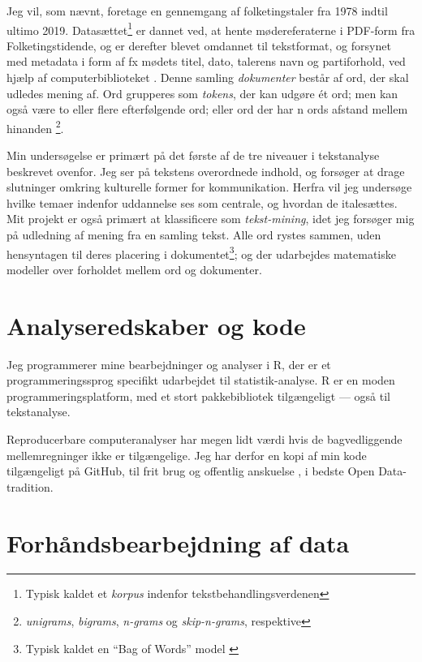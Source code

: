 Jeg vil, som nævnt, foretage en gennemgang af folketingstaler fra 1978 indtil ultimo 2019.
Datasættet\footnote{Typisk kaldet et \textit{korpus} indenfor tekstbehandlingsverdenen} er dannet ved, at hente mødereferaterne i PDF-form fra Folketingstidende, og er derefter blevet omdannet til tekstformat, og forsynet med metadata i form af fx mødets titel, dato, talerens navn og partiforhold, ved hjælp af computerbiblioteket  \autocite{pedersenFolketinget2019}.
Denne samling \textit{dokumenter} består af ord, der skal udledes mening af.
Ord grupperes som \textit{tokens}, der kan udgøre ét ord; men kan også være to eller flere efterfølgende ord; eller ord der har n ords afstand mellem hinanden \footnote{\textit{unigrams}, \textit{bigrams}, \textit{n-grams} og \textit{skip-n-grams}, respektive}.

Min undersøgelse er primært på det første af de tre niveauer i tekstanalyse beskrevet ovenfor.
Jeg ser på tekstens overordnede indhold, og forsøger at drage slutninger omkring kulturelle former for kommunikation.
Herfra vil jeg undersøge hvilke temaer indenfor uddannelse ses som centrale, og hvordan de italesættes.
Mit projekt er også primært at klassificere som \textit{tekst-mining}, idet jeg forsøger mig på udledning af mening fra en samling tekst.
Alle ord rystes sammen, uden hensyntagen til deres placering i dokumentet\footnote{Typisk kaldet en “Bag of Words” model \autocite[s. 28]{kwartlerTextMiningPractice2017}}; og der udarbejdes matematiske modeller over forholdet mellem ord og dokumenter.

\section{Analyseredskaber og kode}

Jeg programmerer mine bearbejdninger og analyser i R, der er et programmeringssprog specifikt udarbejdet til statistik-analyse\autocite{therfoundationWhat}.
R er en moden programmeringsplatform, med et stort pakkebibliotek tilgængeligt — også til tekstanalyse.

Reproducerbare computeranalyser har megen lidt værdi hvis de bagvedliggende mellemregninger ikke er tilgængelige.
Jeg har derfor en kopi af min kode tilgængeligt på GitHub, til frit brug og offentlig anskuelse \autocite{andersenNorseghostMasterthesis2020}, i bedste Open Data-tradition.

\section{Forhåndsbearbejdning af data}\label{sec:preproc}


